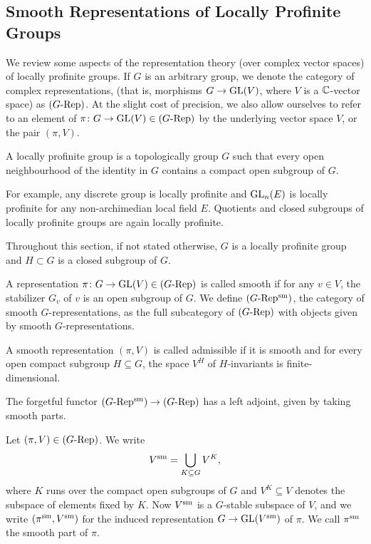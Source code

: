 \documentclass[../main.tex]{subfiles}
\begin{document}
\subsection{Smooth Representations of Locally Profinite Groups}
We review some aspects of the representation theory (over complex vector spaces)
of locally profinite groups. 
If $G$ is an arbitrary group, we denote the category of complex representations,
(that is, morphisms $G \to \operatorname{GL}(V)$, where $V$ is a $\mathbb{C}$-vector space) as
${({G}\textnormal-\allowbreak\mathrm{Rep})}$. At the slight cost of precision, we also allow ourselves to refer to
an element of $\pi\colon G \to \operatorname{GL}(V) \in {({G}\textnormal-\allowbreak\mathrm{Rep})}$ by the underlying vector space
$V$, or the pair $(\pi, V)$. 

\begin{defi}
  A locally profinite group is a topologically group $G$ such that
  every open neighbourhood of the identity in $G$ contains a compact open
  subgroup of $G$.
\end{defi}
For example, any discrete group is locally profinite and $\operatorname{GL}_n(E)$ is locally 
profinite for any non-archimedian local field $E$. Quotients and closed
subgroups of locally profinite groups are again locally profinite.

Throughout this section, if not stated otherwise, $G$ is a locally profinite
group and $H \subset G$ is a closed subgroup of $G$.

\begin{defi}\label{def:SmoothAndAdmRep}
  A representation $\pi\colon G \to \operatorname{GL}(V) \in {({G}\textnormal-\allowbreak\mathrm{Rep})}$ is called smooth
  if for any $v \in V$, the stabilizer $G_v$ of $v$ is an open subgroup
  of $G$. We define ${({G}\textnormal-\allowbreak\mathrm{Rep^{\mathrm{sm}}})}$, the category of smooth $G$-representations, as
  the full subcategory of ${({G}\textnormal-\allowbreak\mathrm{Rep})}$ with objects given by smooth $G$-representations.

  A smooth representation $(\pi, V)$ is called admissible if it is smooth and for every
  open compact subgroup $H \subseteq G$, the space $V^H$ of $H$-invariants 
  is finite-dimensional.
\end{defi}

The forgetful functor ${({G}\textnormal-\allowbreak\mathrm{Rep^{\mathrm{sm}}})} \to {({G}\textnormal-\allowbreak\mathrm{Rep})}$ has a left adjoint, given by taking
smooth parts. 
\begin{defi}
  Let $(\pi,V) \in {({G}\textnormal-\allowbreak\mathrm{Rep})}$. We write 
  \begin{equation*}
    V^{\mathrm{sm}} = \bigcup_{K \subseteq G} V^K,
  \end{equation*}
  where $K$ runs over the compact open subgroups of $G$ and $V^K \subseteq V$
  denotes the subspace of elements fixed by $K$. 
  Now $V^{\mathrm{sm}}$ is a $G$-stable subspace of $V$, and we write $(\pi^{\mathrm{sm}}, V^{\mathrm{sm}})$ 
  for the induced representation $G \to \operatorname{GL}(V^{\mathrm{sm}})$ of $\pi$.
  We call $\pi^{\mathrm{sm}}$ the smooth part of $\pi$.
\end{defi}
\end{document}
